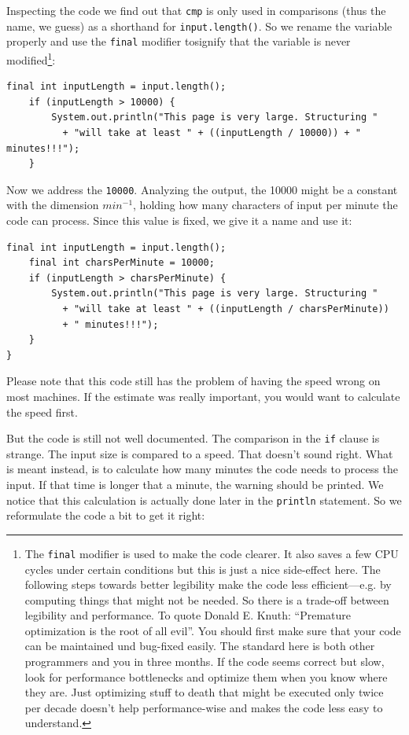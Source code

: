 \documentclass[12pt]{book}
\begin{document}
Inspecting the code we find out that {\tt cmp} is only used in comparisons (thus the name, we guess) as a shorthand for {\tt input.length()}. So we rename the variable properly and use the {\tt final} modifier tosignify that the variable is never modified\footnote{The {\tt final} modifier is used to make the code clearer. It also saves a few CPU cycles under certain conditions but this is just a nice side-effect here. The following steps towards better legibility make the code less efficient---e.g. by computing things that might not be needed. So there is a trade-off between legibility and performance. To quote Donald E. Knuth: ``Premature optimization is the root of all evil''. You should first make sure that your code can be maintained und bug-fixed easily. The standard here is both other programmers and you in three months. If the code seems correct but slow, look for performance bottlenecks and optimize them when you know where they are. Just optimizing stuff to death that might be executed only twice per decade doesn't help performance-wise and makes the code less easy to understand.}:

\begin{lstlisting}[caption=selfdoc2a.java] 
    final int inputLength = input.length();
    if (inputLength > 10000) {
        System.out.println("This page is very large. Structuring "
          + "will take at least " + ((inputLength / 10000)) + " minutes!!!");
    }
\end{lstlisting}

Now we address the {\tt 10000}. Analyzing the output, the 10000 might be a constant with the dimension $min^{-1}$, holding how many characters of input per minute the code can process. Since this value is fixed, we give it a name and use it:


\begin{lstlisting}[caption=selfdoc2b.java] 
    final int inputLength = input.length();
    final int charsPerMinute = 10000;
    if (inputLength > charsPerMinute) {
        System.out.println("This page is very large. Structuring "
          + "will take at least " + ((inputLength / charsPerMinute)) 
          + " minutes!!!");
    }
}
\end{lstlisting}

Please note that this code still has the problem of having the speed wrong on most machines. If the estimate was really important, you would want to calculate the speed first.

But the code is still not well documented. The comparison in the {\tt if} clause is strange. The input size is compared to a speed. That doesn't sound right. What is meant instead, is to calculate how many minutes the code needs to process the input. If that time is longer that a minute, the warning should be printed. We notice that this calculation is actually done later in the {\tt println} statement. So we reformulate the code a bit to get it right:
\end{document}
